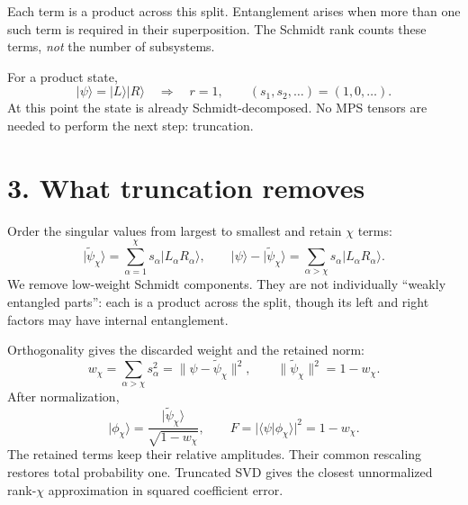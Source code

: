 \documentclass[11pt]{article}
\newcommand{\ket}[1]{\lvert #1\rangle}
\begin{document}
Each term is a product across this split. Entanglement arises when more than one such term is required in their superposition. The Schmidt rank counts these terms, \emph{not} the number of subsystems.

For a product state,
\begin{equation}
\ket\psi=\ket L\ket R
\quad\Longrightarrow\quad r=1,\qquad (s_1,s_2,\ldots)=(1,0,\ldots).
\end{equation}
At this point the state is already Schmidt-decomposed. No MPS tensors are needed to perform the next step: truncation.

\newpage
\section*{3. What truncation removes}
Order the singular values from largest to smallest and retain $\chi$ terms:
\begin{equation}
\ket{\widetilde\psi_\chi}=\sum_{\alpha=1}^\chi s_\alpha\ket{L_\alpha R_\alpha},
\qquad
\ket\psi-\ket{\widetilde\psi_\chi}
=\sum_{\alpha>\chi}s_\alpha\ket{L_\alpha R_\alpha}.
\end{equation}
We remove low-weight Schmidt components. They are not individually ``weakly entangled parts'': each is a product across the split, though its left and right factors may have internal entanglement.

Orthogonality gives the discarded weight and the retained norm:
\begin{equation}
w_\chi=\sum_{\alpha>\chi}s_\alpha^2
=\|\psi-\widetilde\psi_\chi\|^2,
\qquad \|\widetilde\psi_\chi\|^2=1-w_\chi.
\end{equation}
After normalization,
\begin{equation}
\ket{\phi_\chi}=\frac{\ket{\widetilde\psi_\chi}}{\sqrt{1-w_\chi}},
\qquad
F=|\langle\psi|\phi_\chi\rangle|^2=1-w_\chi.
\end{equation}
The retained terms keep their relative amplitudes. Their common rescaling restores total probability one. Truncated SVD gives the closest unnormalized rank-$\chi$ approximation in squared coefficient error.
\end{document}
